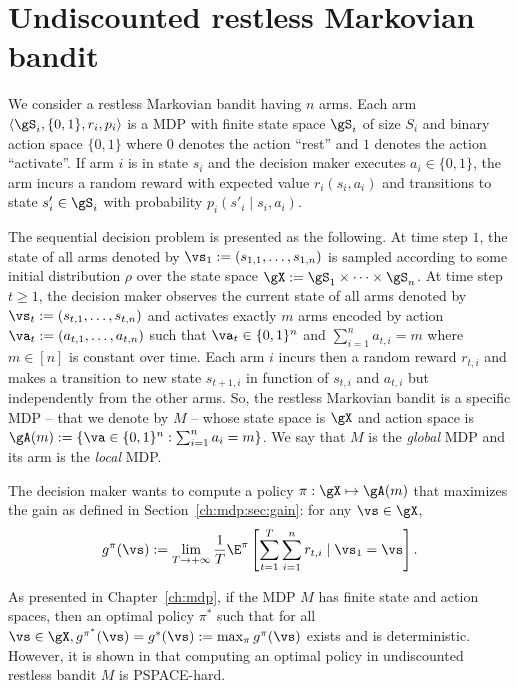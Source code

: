 \section{Undiscounted restless Markovian bandit}
\label{ch:restless:sec:restless}

We consider a restless Markovian bandit having $n$ arms.
Each arm $\langle\gS_i, \{0,1\}, r_i, p_i\rangle$ is a MDP with finite state space $\gS_i$ of size $S_i$ and binary action space $\{0,1\}$ where $0$ denotes the action ``rest'' and $1$ denotes the action ``activate''.
If arm $i$ is in state $s_i$ and the decision maker executes $a_i\in\{0,1\}$, the arm incurs a random reward with expected value $r_i(s_i,a_i)$ and transitions to state $s'_i\in\gS_i$ with probability $p_i(s'_i\mid s_i,a_i)$.

The sequential decision problem is presented as the following.
At time step $1$, the state of all arms denoted by $\vs_1:=(s_{1,1},\dots,s_{1,n})$ is sampled according to some initial distribution $\rho$ over the state space $\gX:=\gS_1\times\dots\times\gS_n$.
At time step $t\ge1$, the decision maker observes the current state of all arms denoted by $\vs_t:=(s_{t,1},\dots,s_{t,n})$ and activates exactly $m$ arms encoded by action $\va_t:=(a_{t,1},\dots,a_{t,n})$ such that $\va_t\in\{0,1\}^n$ and $\sum_{i=1}^{n} a_{t,i}=m$ where $m\in[n]$ is constant over time.
Each arm $i$ incurs then a random reward $r_{t,i}$ and makes
a transition to new state $s_{t+1,i}$ in function of $s_{t,i}$ and $a_{t,i}$ but independently from the other arms.
So, the restless Markovian bandit is a specific MDP -- that we denote by $M$ -- whose state space is $\gX$ and action space is $\gA(m):=\{\va\in\{0,1\}^n : \sum_{i=1}^{n}a_i =m\}$.
We say that $M$ is the \emph{global} MDP and its arm is the \emph{local} MDP.

The decision maker wants to compute a policy $\pi:\gX\mapsto\gA(m)$ that maximizes the gain as defined in Section~\ref{ch:mdp:sec:gain}: for any $\vs\in\gX$,
\begin{equation}
    \label{ch:restless:eq:obj}
    g^\pi(\vs):=\lim_{T\to+\infty}\frac1T \E^\pi\left[ \sum_{t=1}^{T} \sum_{i=1}^nr_{t,i} \mid \vs_1=\vs\right].
\end{equation}

As presented in Chapter~\ref{ch:mdp}, if the MDP $M$ has finite state and action spaces, then an optimal policy $\pi^*$ such that for all $\vs\in\gX, g^{\pi^*}(\vs)=g^*(\vs):=\max_{\pi}g^{\pi}(\vs)$ exists and is deterministic.
However, it is shown in \cite[Theorem~4]{papadimitriou1994complexity} that computing an optimal policy in undiscounted restless bandit $M$ is PSPACE-hard.

